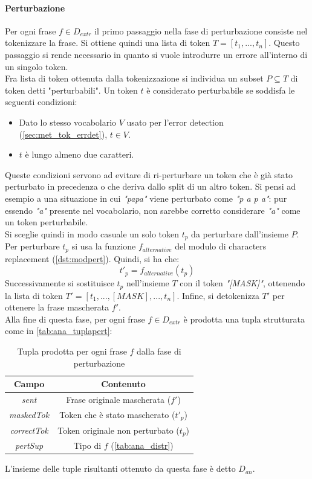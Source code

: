 \paragraph{Perturbazione}
Per ogni frase $f \in D_{extr}$ il primo passaggio nella fase di perturbazione consiste nel tokenizzare la frase. Si ottiene quindi una lista di token $T = [t_1,...,t_n]$. Questo passaggio si rende necessario in quanto si vuole introdurre un errore all'interno di un singolo token.\\
Fra lista di token ottenuta dalla tokenizzazione si individua un subset $P \subseteq T$ di token detti "perturbabili". Un token $t$ è considerato perturbabile se soddisfa le seguenti condizioni:
\begin{itemize}
\item Dato lo stesso vocabolario $V$ usato per l'error detection (\autoref{sec:met_tok_errdet}), $t \in V$.

\item $t$ è lungo almeno due caratteri.
\end{itemize}
Queste condizioni servono ad evitare di ri-perturbare un token che è già stato perturbato in precedenza o che deriva dallo split di un altro token. Si pensi ad esempio a una situazione in cui \textit{"papa"} viene perturbato come \textit{"p a p a"}: pur essendo \textit{"a"} presente nel vocabolario, non sarebbe corretto considerare \textit{"a"} come un token perturbabile.\\
Si sceglie quindi in modo casuale un solo token $t_p$ da perturbare dall'insieme $P$. Per perturbare $t_p$ si usa la funzione $f_{alternative}$ del modulo di characters replacement (\autoref{dst:modpert}). Quindi, si ha che:
\begin{equation}
t\prime_p = f_{alternative}(t_p)
\end{equation}
Successivamente si sostituisce $t_p$ nell'insieme $T$ con il token \textit{"[MASK]"}, ottenendo la lista di token $T\prime = [t_1,...,[MASK],...,t_n]$. Infine, si detokenizza $T\prime$ per ottenere la frase mascherata $f\prime$. \\
Alla fine di questa fase, per ogni frase $f \in D_{extr}$ è prodotta una tupla strutturata come in \autoref{tab:ana_tuplapert}:

\begin{table}[H]
\centering
\begin{tabular}{cc}
\textbf{Campo} & \textbf{Contenuto}\\ \hline
\textit{sent} & Frase originale mascherata ($f\prime$)\\
\textit{maskedTok} & Token che è stato mascherato ($t\prime_p$)\\
\textit{correctTok} & Token originale non perturbato ($t_p$)\\
\textit{pertSup} & Tipo di $f$ (\autoref{tab:ana_distr}) \\
\end{tabular}
\caption{Tupla prodotta per ogni frase $f$ dalla fase di perturbazione}
\label{tab:ana_tuplapert}
\end{table}
\noindent
L'insieme delle tuple risultanti ottenuto da questa fase è detto $D_{an}$.

